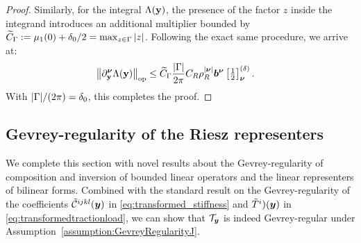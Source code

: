 \begin{proof}
	Similarly, for the integral $\Lambda({\mathbf{y}})$, the presence of the factor $z$ inside the integrand introduces an additional multiplier bounded by $\widetilde C_\Gamma := \mu_1(0) + \delta_0/2  =  \max_{z \in \Gamma} {\left|z\right|} $. Following the exact same procedure, we arrive at:
	\begin{align*}
		{\left\| \partial_{{\mathbf{y}}}^{{\boldsymbol{\nu}}} \Lambda({\mathbf{y}}) \right\|_{\mathrm{op}}}
		&\leq \widetilde C_\Gamma  \frac{{\left|\Gamma\right|}}{2\pi}C_R \rho_R^{{\left|{\boldsymbol{\nu}}\right|}} {\boldsymbol{b}}^{\boldsymbol{\nu}} \left[\tfrac{1}{2} \right]^{(\delta)}_{{\boldsymbol{\nu}}}.
	\end{align*}
	With  $  {\left|\Gamma\right|}/(2\pi) = \delta_0 $, this completes the proof.
\end{proof}

\subsection{Gevrey-regularity of the Riesz representers}
\label{subsec:proofTyRegularity}
We complete this section with novel results about the Gevrey-regularity of composition and inversion of bounded linear operators and the linear representers of bilinear forms. 
Combined with the standard result on the Gevrey-regularity of the coefficients $\tilde {\mathcal{C}}^{ijkl}({\boldsymbol{y}})$ in \eqref{eq:transformed_stiffness} and $
\tilde T^i)({\boldsymbol{y}})$ in \eqref{eq:transformedtractionload}, we can show that $\mathcal{T}_{{\boldsymbol{y}}}$ is indeed Gevrey-regular under Assumption~\ref{assumption:GevreyRegularityJ}.

